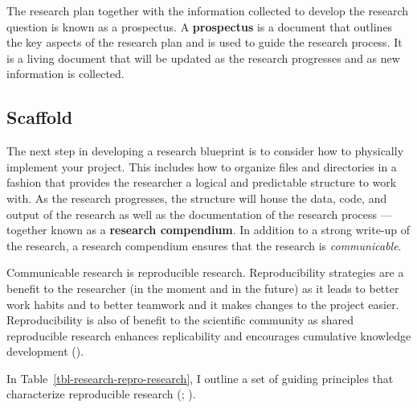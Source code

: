 \documentclass[
  letterpaper,
  krantz1]{latex/krantz-mod}
\theoremstyle{definition}
\theoremstyle{definition}
\theoremstyle{remark}
\begin{document}
The research plan together with the information collected to develop the
research question is known as a prospectus. A
\textbf{prospectus} is a document that outlines the
key aspects of the research plan and is used to guide the research
process. It is a living document that will be updated as the research
progresses and as new information is collected.

\subsection{Scaffold}\label{sec-research-scaffold}

The next step in developing a research blueprint
is to consider how to physically implement your
project. This includes how to organize
files and directories in a fashion that provides the researcher a
logical and predictable structure to work with. As the research
progresses, the structure will house the data, code, and output of the
research as well as the documentation of the research process
---together known as a \textbf{research
compendium}. In addition to a strong write-up
of the research, a research compendium ensures that the research is
\emph{communicable}.

Communicable research is reproducible
research. Reproducibility strategies are a
benefit to the researcher (in the moment and in the future) as it leads
to better work habits and to better teamwork and it makes changes to the
project easier. Reproducibility is also of benefit to the scientific
community as shared reproducible research enhances replicability and
encourages cumulative knowledge development
().

In Table~\ref{tbl-research-repro-research}, I outline a set of guiding
principles that characterize reproducible research
(;
).
\end{document}
